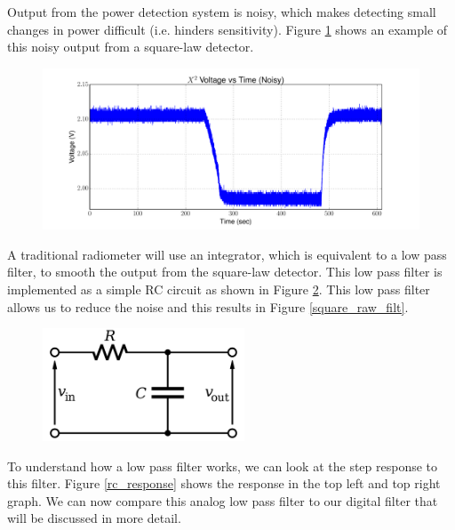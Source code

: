 Output from the power detection system is noisy, which makes detecting small changes in power difficult (i.e. hinders sensitivity).  Figure \ref{square_raw} shows an example of this noisy output from a square-law detector.

{\begin{figure}[h!tb] 
\centering
\includegraphics[width=17cm]{Experiments/Exp1/noisy_voltage.pdf}
\label{square_raw}
\end{figure}
}

A traditional radiometer will use an integrator, which is equivalent to a low pass filter, to smooth the output from the square-law detector.  This low pass filter is implemented as a simple RC circuit as shown in Figure \ref{rc_circuit}.  This low pass filter allows us to reduce the noise and this results in Figure \ref{square_raw_filt}.  

{\begin{figure}[h!tb] 
\centering
\includegraphics[width=6cm]{Images/rc_lpf.png}
\label{rc_circuit}
\end{figure}
}

To understand how a low pass filter works, we can look at the step response to this filter.  Figure \ref{rc_response} shows the response in the top left and top right graph.  We can now compare this analog low pass filter to our digital filter that will be discussed in more detail.  


